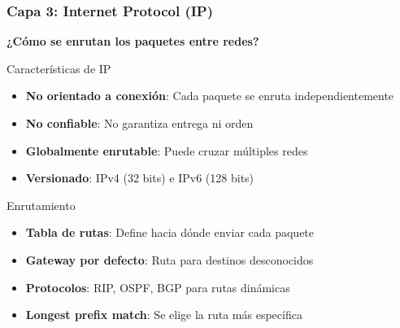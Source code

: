\documentclass[aspectratio=169]{beamer}
\begin{document}
        \begin{frame}
          \frametitle{Capa 3: Internet Protocol (IP)}
          
          \begin{center}
          \Large \textbf{¿Cómo se enrutan los paquetes entre redes?}
          \end{center}
          
          \begin{block}{Características de IP}
          \begin{itemize}
          \item \textbf{No orientado a conexión}: Cada paquete se enruta independientemente
          \item \textbf{No confiable}: No garantiza entrega ni orden
          \item \textbf{Globalmente enrutable}: Puede cruzar múltiples redes
          \item \textbf{Versionado}: IPv4 (32 bits) e IPv6 (128 bits)
          \end{itemize}
          \end{block}
          
          
          \begin{block}{Enrutamiento}
          \begin{itemize}
          \item \textbf{Tabla de rutas}: Define hacia dónde enviar cada paquete
          \item \textbf{Gateway por defecto}: Ruta para destinos desconocidos
          \item \textbf{Protocolos}: RIP, OSPF, BGP para rutas dinámicas
          \item \textbf{Longest prefix match}: Se elige la ruta más específica
          \end{itemize}
          \end{block}
          \end{frame}
\end{document}
